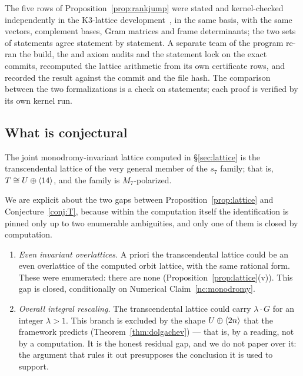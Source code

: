 \begin{remark}\label{rem:rankjump-verification}
The five rows of Proposition~\ref{prop:rankjump} were stated and kernel-checked
independently in the K3-lattice development~\cite{LeanMaster2026}, in the same
basis, with the same vectors, complement bases, Gram matrices and frame
determinants; the two sets of statements agree statement by statement. A
separate team of the program re-ran the build, the  and axiom
audits and the statement lock on the exact commits, recomputed the lattice
arithmetic from its own certificate rows, and recorded the result against the
commit and the file hash. The comparison between the two formalizations is a
check on statements; each proof is verified by its own kernel run.
\end{remark}

\subsection{What is conjectural}

\begin{conjecture}\label{conj:T}
The joint monodromy-invariant lattice computed in \S\ref{sec:lattice} is the
transcendental lattice of the very general member of the $s_7$ family; that
is, $T \cong U\oplus\langle 14\rangle$, and the family is $M_7$-polarized.
\end{conjecture}

We are explicit about the two gaps between Proposition~\ref{prop:lattice} and
Conjecture~\ref{conj:T}, because within the computation itself the
identification is pinned only up to two enumerable ambiguities, and only one
of them is closed by computation.

\begin{enumerate}
\item \emph{Even invariant overlattices.} A priori the transcendental lattice
  could be an even overlattice of the computed orbit lattice, with the same
  rational form. These were enumerated: there are none
  (Proposition~\ref{prop:lattice}(v)). This gap is closed, conditionally on
  Numerical Claim~\ref{nc:monodromy}.
\item \emph{Overall integral rescaling.} The transcendental lattice could
  carry $\lambda\cdot G$ for an integer $\lambda>1$. This branch is excluded
  by the shape $U\oplus\langle 2n\rangle$ that the framework predicts
  (Theorem~\ref{thm:dolgachev}) --- that is, by a reading, not by a
  computation. It is the honest residual gap, and we do not paper over it: the
  argument that rules it out presupposes the conclusion it is used to support.
\end{enumerate}

